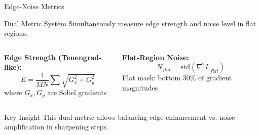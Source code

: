 \documentclass[aspectratio=169]{beamer}
\begin{document}
\begin{frame}{Edge-Noise Metrics}
    \begin{block}{Dual Metric System}
        Simultaneously measure edge strength and noise level in flat regions.
    \end{block}
    
    \begin{columns}
        \textbf{Edge Strength (Tenengrad-like):}
        \begin{equation}
            E = \frac{1}{MN}\sum \sqrt{G_x^2 + G_y^2}
        \end{equation}
        where $G_x, G_y$ are Sobel gradients
        
        \textbf{Flat-Region Noise:}
        \begin{equation}
            N_{flat} = \text{std}(\nabla^2 I |_{flat})
        \end{equation}
        Flat mask: bottom 30\% of gradient magnitudes
    \end{columns}
    
    \vspace{0.3cm}
    \begin{alertblock}{Key Insight}
        This dual metric allows balancing edge enhancement vs. noise amplification in sharpening steps.
    \end{alertblock}
\end{frame}
\end{document}
